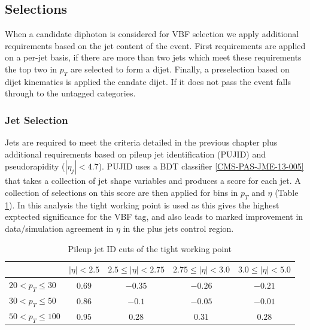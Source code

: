 \subsection{Selections}

When a candidate diphoton is considered for VBF selection we apply additional requirements based on the jet content of the event. First requirements are applied on a per-jet basis, if there are more than two jets which meet these requirements the top two in $p_{T}$ are selected to form a dijet. Finally, a preselection based on dijet kinematics is applied the candate dijet. If it does not pass the event falls through to the untagged categories. 

\subsubsection{Jet Selection}

Jets are required to meet the criteria detailed in the previous chapter plus additional requirements based on pileup jet identification (PUJID) and pseudorapidity ($|\eta_{j}| < 4.7$).
PUJID uses a BDT classifier \ref{CMS-PAS-JME-13-005} that takes a collection of jet shape variables and produces a score for each jet. A collection of selections on this score are then applied for bins in $p_{T}$ and $\eta$ (Table \ref{tab:event_selection:tight_pujid}). In this analysis the tight working point is used as this gives the highest exptected significance for the VBF tag, and also leads to marked improvement in data/simulation agreement in $\eta$ in the \Zee plus jets control region.%
\begin{table}[h!]
    \begin{tabular}{ l || c | c | c | c }
         & $|\eta| < 2.5$ & $2.5 \leq |\eta| < 2.75$ & $2.75 \leq |\eta| < 3.0$ & $3.0 \leq |\eta| < 5.0$ \\
        \hline
        \hline
        $20 < p_{T} \leq 30$  & $0.69$ & $-0.35$ & $-0.26$ & $-0.21$ \\
        $30 < p_{T} \leq 50$  & $0.86$ & $-0.1$  & $-0.05$ & $-0.01$ \\
        $50 < p_{T} \leq 100$ & $0.95$ & $0.28$  & $0.31$  & $0.28$  \\
\end{tabular}
    \caption{Pileup jet ID cuts of the tight working point}
    \label{tab:event_selection:tight_pujid}
\end{table}

